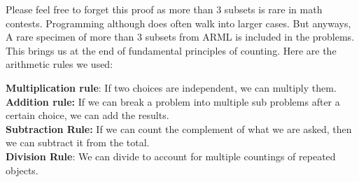 Please feel free to forget this proof as more than $3$ subsets is rare in math contests. Programming although does often walk into larger cases. But anyways, A rare specimen of more than $3$ subsets from ARML is included in the problems.\\
This brings us at the end of fundamental principles of counting. Here are the arithmetic rules we used:\\
\begin{theorem}
        \textbf{Multiplication rule}: If two choices are independent, we can multiply them.\\
    \textbf{Addition rule:} If we can break a problem into multiple sub problems after a certain choice, we can add the results.\\
    \textbf{Subtraction Rule:} If we can count the complement of what we are asked, then we can subtract it from the total.\\
    \textbf{Division Rule}: We can divide to account for multiple countings of repeated objects.\\
\end{theorem}
